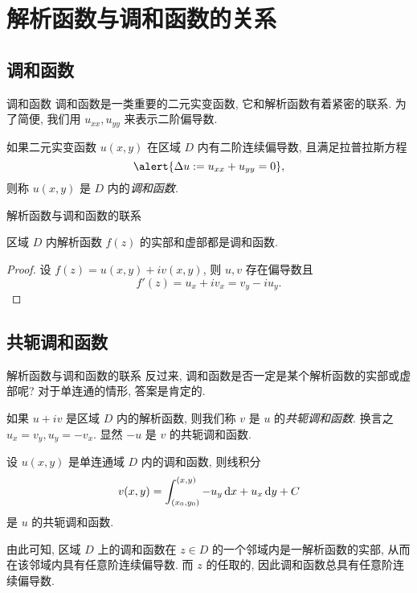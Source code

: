 \section{解析函数与调和函数的关系}


\subsection{调和函数}

\begin{frame}{调和函数}
	\onslide<+->
	调和函数是一类重要的二元实变函数, 它和解析函数有着紧密的联系.
	\onslide<+->
	为了简便, 我们用 $u_{xx},u_{yy}$ 来表示二阶偏导数.

	\onslide<+->
	\begin{definition}
		如果二元实变函数 $u(x,y)$ 在区域 $D$ 内有二阶连续偏导数, 且满足拉普拉斯方程
		\[\alert{\Delta u:=u_{xx}+u_{yy}=0},\]
		则称 $u(x,y)$ 是 $D$ 内的\emph{调和函数}.
	\end{definition}
\end{frame}


\begin{frame}{解析函数与调和函数的联系}
	\onslide<+->
	\begin{theorem}
		区域 $D$ 内解析函数 $f(z)$ 的实部和虚部都是调和函数.
	\end{theorem}

	\onslide<+->
	\begin{proof}
		设 $f(z)=u(x,y)+iv(x,y)$, 则 $u,v$ 存在偏导数且
			\[f'(z)=u_x+iv_x=v_y-iu_y.\]
		\onslide<+->{可知
			\[\Delta u=u_{xx}+u_{yy}=v_{yx}-v_{xy}=0,\]}
			\vspace{-\baselineskip}
		\onslide<+->{
			\[\Delta v=v_{xx}+v_{yy}=-u_{yx}+u_{xy}=0.\qedhere\]}
		\vspace{-\baselineskip}
	\end{proof}
\end{frame}


\subsection{共轭调和函数}
\begin{frame}{解析函数与调和函数的联系}
	\onslide<+->
	反过来, 调和函数是否一定是某个解析函数的实部或虚部呢?
	\onslide<+->
	对于单连通的情形, 答案是肯定的.

	\onslide<+->
	如果 $u+iv$ 是区域 $D$ 内的解析函数, 则我们称 $v$ 是 $u$ 的\emph{共轭调和函数}.
	\onslide<+->
	换言之 $u_x=v_y,u_y=-v_x$.
	\onslide<+->
	显然 $-u$ 是 $v$ 的共轭调和函数.
	\onslide<+->
	\begin{theorem}
		设 $u(x,y)$ 是单连通域 $D$ 内的调和函数, 则线积分
		\[v(x,y)=\int_{(x_0,y_0)}^{(x,y)}-u_y\,\mathrm{d} x+u_x\,\mathrm{d} y+C\]
		是 $u$ 的共轭调和函数.
	\end{theorem}
	\onslide<+->
	由此可知, 区域 $D$ 上的调和函数在 $z\in D$ 的一个邻域内是一解析函数的实部, 从而在该邻域内具有任意阶连续偏导数.
	\onslide<+->
	而 $z$ 的任取的, 因此调和函数总具有任意阶连续偏导数.
\end{frame}


